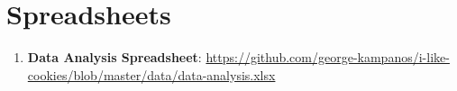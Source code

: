 \documentclass[../main.tex]{subfiles}
\begin{document}
\section{Spreadsheets}

\begin{enumerate}[label=\textbf{A.3.\arabic*}:, ref=A.3.\arabic*, leftmargin=1.65cm]
    \item \label{app:data_analysis_spreadsheet} \textbf{Data Analysis Spreadsheet}: \url{https://github.com/george-kampanos/i-like-cookies/blob/master/data/data-analysis.xlsx}
\end{enumerate}
\end{document}
